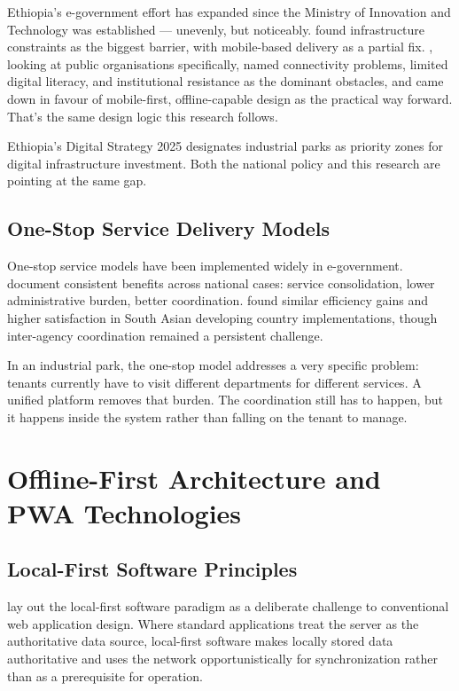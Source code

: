 Ethiopia's e-government effort has expanded since the Ministry of Innovation and Technology was established --- unevenly, but noticeably. \citet{Lessa2019} found infrastructure constraints as the biggest barrier, with mobile-based delivery as a partial fix. \citet{Denbu2019}, looking at public organisations specifically, named connectivity problems, limited digital literacy, and institutional resistance as the dominant obstacles, and came down in favour of mobile-first, offline-capable design as the practical way forward. That's the same design logic this research follows.

Ethiopia's Digital Strategy 2025 designates industrial parks as priority zones for digital infrastructure investment. Both the national policy and this research are pointing at the same gap.

\subsection{One-Stop Service Delivery Models}

One-stop service models have been implemented widely in e-government. \citet{Askim2011} document consistent benefits across national cases: service consolidation, lower administrative burden, better coordination. \citet{Bhatnagar2014} found similar efficiency gains and higher satisfaction in South Asian developing country implementations, though inter-agency coordination remained a persistent challenge.

In an industrial park, the one-stop model addresses a very specific problem: tenants currently have to visit different departments for different services. A unified platform removes that burden. The coordination still has to happen, but it happens inside the system rather than falling on the tenant to manage.

\section{Offline-First Architecture and PWA Technologies}

\subsection{Local-First Software Principles}

\citet{Kleppmann2019} lay out the local-first software paradigm as a deliberate challenge to conventional web application design. Where standard applications treat the server as the authoritative data source, local-first software makes locally stored data authoritative and uses the network opportunistically for synchronization rather than as a prerequisite for operation.

